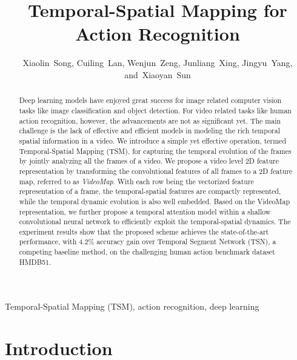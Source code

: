 \documentclass[english, 10pt, twocolumn, twoside]{IEEEtran}
\begin{document}
\title{Temporal-Spatial Mapping for Action Recognition}
\author{Xiaolin~Song,
        Cuiling~Lan,
        Wenjun~Zeng,
        Junliang~Xing,
        Jingyu~Yang,
        and~Xiaoyan~Sun 



}









\maketitle

\begin{abstract}
Deep learning models have enjoyed great success for image related computer vision tasks like image classification and object detection. For video related tasks like human action recognition, however, the advancements are not as significant yet. The main challenge is the lack of effective and efficient models in modeling the rich temporal spatial information in a video. We introduce a simple yet effective operation, termed Temporal-Spatial Mapping (TSM), for capturing the temporal evolution of the frames by jointly analyzing all the frames of a video. We propose a video level 2D feature representation by transforming the convolutional features of all frames to a 2D feature map, referred to as \emph{VideoMap}. With each row being the vectorized feature representation of a frame, the temporal-spatial features are compactly represented, while the temporal dynamic evolution is also well embedded. Based on the VideoMap representation, we further propose a temporal attention model within a shallow convolutional neural network to efficiently exploit the temporal-spatial dynamics. The experiment results show that the proposed scheme achieves the state-of-the-art performance, with 4.2\% accuracy gain over Temporal Segment Network (TSN), a competing baseline method, on the challenging human action benchmark dataset HMDB51.

\end{abstract}

\begin{IEEEkeywords}
Temporal-Spatial Mapping (TSM), action recognition, deep learning
\end{IEEEkeywords}

\IEEEpeerreviewmaketitle



\section{Introduction}
\label{secIntroduction}
\end{document}

